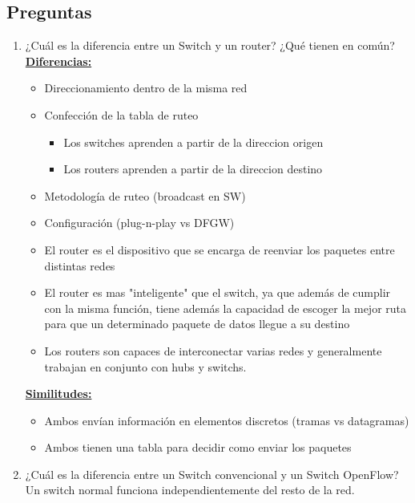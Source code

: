 \subsection{Preguntas}	
	\begin{enumerate}
		\item ¿Cuál es la diferencia entre un Switch y un router? ¿Qué tienen en común?
			\underline{\textbf{Diferencias:}}
				\begin{itemize}
					\item Direccionamiento dentro de la misma red
					\item Confección de la tabla de ruteo
						\begin{itemize}
							\item Los switches aprenden a partir de la direccion origen
							\item Los routers aprenden a partir de la direccion destino
						\end{itemize}
					\item Metodología de ruteo (broadcast en SW)
					\item Configuración (plug-n-play vs DFGW)
					\item El router es el dispositivo que se encarga de reenviar los paquetes entre distintas redes
					\item El router es mas "inteligente" que el switch, ya que además de cumplir con la misma función, 						tiene además la capacidad de escoger la mejor ruta para que un determinado paquete de datos llegue a su 					destino
					\item Los routers son capaces de interconectar varias redes y generalmente trabajan en conjunto con 						hubs y switchs.
				\end{itemize}
			\underline{\textbf{Similitudes:}}
				\begin{itemize}
					\item Ambos envían información en elementos discretos (tramas vs datagramas)
					\item Ambos tienen una tabla para decidir como enviar los paquetes
				\end{itemize}
		\item ¿Cuál es la diferencia entre un Switch convencional y un Switch OpenFlow?
			Un switch normal funciona independientemente del resto de la red.


\end{enumerate}
